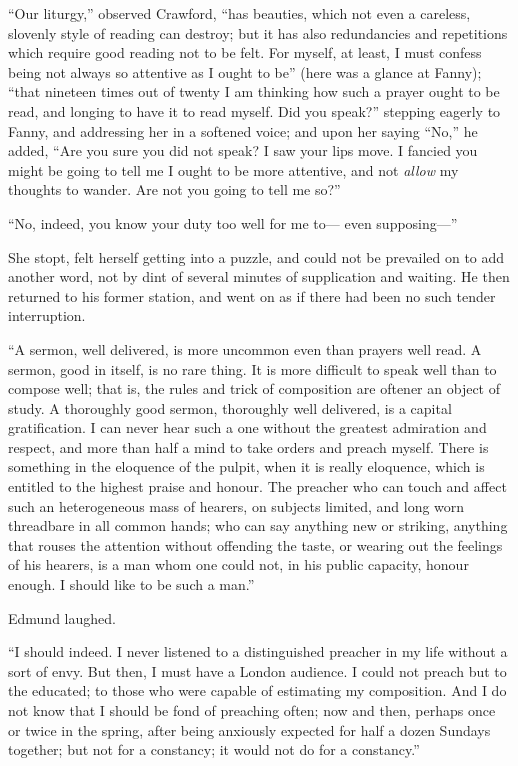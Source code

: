 \documentclass{article}
\begin{document}
``Our liturgy,'' observed Crawford, ``has beauties, which not
even a careless, slovenly style of reading can destroy;
but it has also redundancies and repetitions which require
good reading not to be felt.  For myself, at least, I must
confess being not always so attentive as I ought to be''
(here was a glance at Fanny); ``that nineteen times out of
twenty I am thinking how such a prayer ought to be read,
and longing to have it to read myself.  Did you speak?''
stepping eagerly to Fanny, and addressing her in a
softened voice; and upon her saying ``No,'' he added,
``Are you sure you did not speak?  I saw your lips move.
I fancied you might be going to tell me I ought to be
more attentive, and not \emph{allow} my thoughts to wander.
Are not you going to tell me so?''

``No, indeed, you know your duty too well for me to---%
even supposing---''

She stopt, felt herself getting into a puzzle, and could
not be prevailed on to add another word, not by dint
of several minutes of supplication and waiting.  He then
returned to his former station, and went on as if there
had been no such tender interruption.

``A sermon, well delivered, is more uncommon even than prayers
well read.  A sermon, good in itself, is no rare thing.
It is more difficult to speak well than to compose well;
that is, the rules and trick of composition are
oftener an object of study.  A thoroughly good sermon,
thoroughly well delivered, is a capital gratification.
I can never hear such a one without the greatest admiration
and respect, and more than half a mind to take orders
and preach myself.  There is something in the eloquence
of the pulpit, when it is really eloquence, which is entitled
to the highest praise and honour.  The preacher who can
touch and affect such an heterogeneous mass of hearers,
on subjects limited, and long worn threadbare in all
common hands; who can say anything new or striking,
anything that rouses the attention without offending the taste,
or wearing out the feelings of his hearers, is a man whom
one could not, in his public capacity, honour enough.
I should like to be such a man.''

Edmund laughed.

``I should indeed.  I never listened to a distinguished
preacher in my life without a sort of envy.  But then,
I must have a London audience.  I could not preach but
to the educated; to those who were capable of estimating
my composition.  And I do not know that I should be fond
of preaching often; now and then, perhaps once or twice
in the spring, after being anxiously expected for half
a dozen Sundays together; but not for a constancy;
it would not do for a constancy.''
\end{document}
